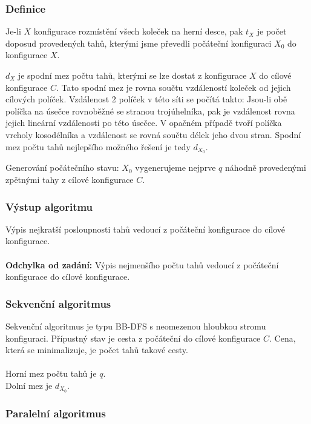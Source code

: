 \documentclass[12pt,a4paper]{article}
\begin{document}
\subsubsection{Definice}

Je-li $ X $ konfigurace rozmístění všech koleček na herní desce, pak $ t_{X} $ je počet doposud provedených tahů, kterými jsme převedli počáteční konfiguraci $ X_{0} $ do konfigurace $ X $.

$ d_{X} $ je spodní mez počtu tahů, kterými se lze dostat z konfigurace $ X $ do cílové konfigurace $ C $. Tato spodní mez je rovna součtu vzdáleností koleček od jejich cílových políček. Vzdálenost 2 políček v této síti se počítá takto: Jsou-li obě políčka na úsečce rovnoběžné se stranou trojúhelníka, pak je vzdálenost rovna jejich lineární vzdálenosti po této úsečce. V opačném případě tvoří políčka vrcholy kosodélníka a vzdálenost se rovná součtu délek jeho dvou stran. Spodní mez počtu tahů nejlepšího možného řešení je tedy $ d_{X_{0}} $.

Generování počátečního stavu: $ X_{0} $ vygenerujeme nejprve $ q $ náhodně provedenými zpětnými tahy z cílové konfigurace $ C $.

\subsubsection{Výstup algoritmu}

Výpis nejkratší posloupnosti tahů vedoucí z počáteční konfigurace do cílové konfigurace.\\
\\
\textbf{Odchylka od zadání:} Výpis nejmenšího počtu tahů vedoucí z počáteční konfigurace do cílové konfigurace.

\subsubsection{Sekvenční algoritmus}

Sekvenční algoritmus je typu BB-DFS s neomezenou hloubkou stromu konfiguraci. Přípustný stav je cesta z počáteční do cílové konfigurace $ C $. Cena, která se minimalizuje, je počet tahů takové cesty.\\
\\
Horní mez počtu tahů je $ q $.
\\
Dolní mez je $ d_{X_{0}} $.

\subsubsection{Paralelní algoritmus}
\end{document}

